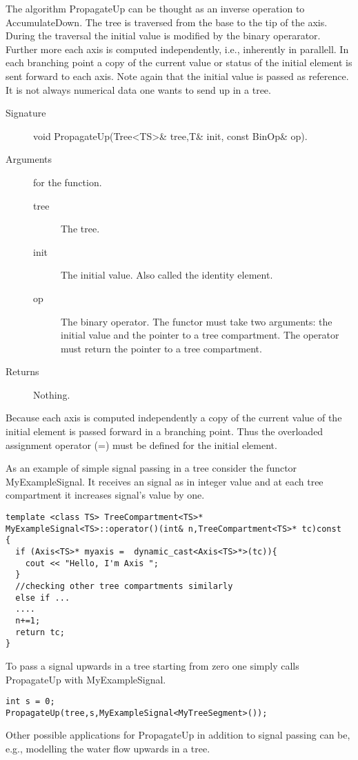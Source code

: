 The algorithm PropagateUp  can be thought as  an inverse  operation to
AccumulateDown. The tree is traversed from the  base to the tip of the
axis. During the traversal the initial value is modified by the binary
operarator. Further  more each axis  is computed  independently, i.e.,
inherently in parallell. In each branching point a copy of the current
value or status of the  initial element is  sent forward to each axis.
Note again  that the initial value  is passed as  reference. It is not
always numerical data one wants to send up in a tree.

\begin{description}
   \item [Signature] void PropagateUp(Tree<TS>\& tree,T\& init, const BinOp\& op).
   \item [Arguments] for the function.
     \begin{description}
        \item [tree] The tree.
        \item [init] The initial value. Also called the identity
     element.
        \item [op] The binary operator. The functor must take two
     arguments: the initial value and the pointer to a tree compartment. The
     operator must return the pointer to a tree compartment.
     \end{description} 
   \item[Returns] Nothing.
\end{description} 
 
Because  each  axis is computed   independently a copy of  the current
value  of  the initial  element   is  passed forward   in a  branching
point. Thus the overloaded assignment operator (=) must be defined for
the initial element.

As an example of simple signal passing in a  tree consider the functor
MyExampleSignal. It receives an signal as in integer value and at each
tree compartment it increases signal's value by one.

\begin{verbatim}
template <class TS> TreeCompartment<TS>* 
MyExampleSignal<TS>::operator()(int& n,TreeCompartment<TS>* tc)const
{
  if (Axis<TS>* myaxis =  dynamic_cast<Axis<TS>*>(tc)){
    cout << "Hello, I'm Axis ";
  }
  //checking other tree compartments similarly
  else if ...  
  ....
  n+=1;
  return tc; 
}
\end{verbatim}

To pass a signal upwards in a tree starting from zero one simply calls
PropagateUp with MyExampleSignal.

\begin{verbatim}
int s = 0;
PropagateUp(tree,s,MyExampleSignal<MyTreeSegment>());
\end{verbatim}

Other possible  applications for  PropagateUp   in addition to  signal
passing can be, e.g., modelling the water flow upwards in a tree.


